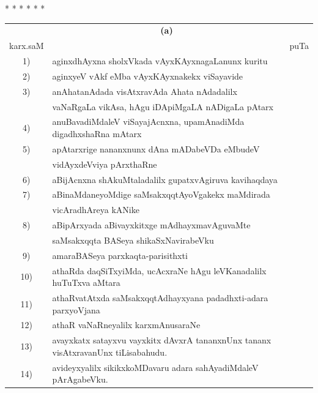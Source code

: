 {\begin{center}
* * * * * *
\end{center}



\begin{longtable}{@{}cp{7.4cm}r}
   &      \multicolumn{1}{c}{\textbf{(a)}} & \\[0.5cm]
karx.saM &                                             & puTa\\[0.5cm]
1) & aginxdhAyxna sholxVkada vAyxKAyxnagaLanunx kuritu & \pageref{page208}\\
2) & aginxyeV vAkf eMba vAyxKAyxnakekx viSayavide & \pageref{page211}\\
3) & anAhatanAdada visAtxravAda Ahata nAdadalilx  & \\
   & vaNaRgaLa vikAsa, hAgu iDApiMgaLA nADigaLa pAtarx & \pageref{page211}\\
4) & anuBavadiMdaleV viSayajAcnxna, upamAnadiMda digadhxshaRna mAtarx & \pageref{page166}\\
5) & apAtarxrige nananxnunx dAna mADabeVDa eMbudeV & \\
   & vidAyxdeVviya pArxthaRne  &  \pageref{page48a}\\
6) & aBijAcnxna shAkuMtaladalilx gupatxvAgiruva kavihaqdaya & \pageref{page234}\\  
7) & aBinaMdaneyoMdige saMsakxqqtAyoVgakekx maMdirada & \\
   & vicAradhAreya kANike                   & \pageref{page63}\\
8) & aBipArxyada aBivayxkitxge mAdhayxmavAguvaMte & \\
   & saMsakxqqta BASeya shikaSxNavirabeVku & \pageref{page52}\\
9) & amaraBASeya parxkaqta-parisithxti & \pageref{page25}\\
10) & athaRda daqSiTxyiMda, ucAcxraNe hAgu leVKanadalilx huTuTxva aMtara & \pageref{page180}\\
11) & athaRvatAtxda saMsakxqqtAdhayxyana padadhxti-adara parxyoVjana & \pageref{page4}\\
12) & athaR vaNaRneyalilx karxmAnusaraNe & \pageref{page114}\\
13) & avayxkatx satayxvu vayxkitx dAvxrA tananxnUnx tananx visAtxravanUnx tiLisabahudu. & \pageref{page108}\\
14) & avideyxyalilx sikikxkoMDavaru adara sahAyadiMdaleV pArAgabeVku. &\pageref{page160}\\

\end{longtable}}
